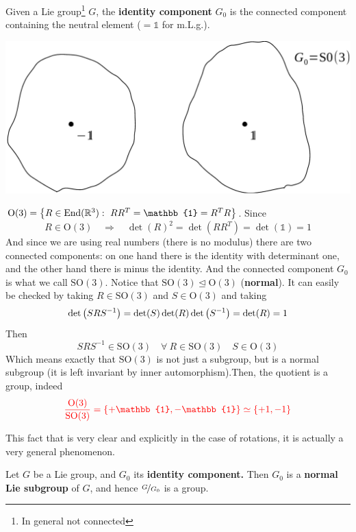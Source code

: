 \documentclass[../main.tex]{subfiles}
\begin{document}
\begin{definition} Given a Lie group\footnote{In general not connected} $G$, the \textbf{identity component} $G_0$ is the connected component containing the neutral element ($=\mathbb{1}$ for m.L.g.).
\end{definition}
\begin{marginfigure}[15mm]
	\includegraphics[width=1.2\linewidth]{images/Identity_component.pdf}
	\caption{}
\end{marginfigure}
\begin{example}
\( \textrm{O}(3)=\Bqty{R\in\textrm{End}(\mathbb{R}^3): \ RR^T=\mathbb{1}=R^TR}\). Since
\[
R\in\textrm{O}(3) \quad \Rightarrow \quad \det(R)^2=\det(RR^T)=\det(\mathbb{1})=1
\]
And since we are using real numbers (there is no modulus) there are two connected components: on one hand there is the identity with determinant one, and the other hand there is minus the identity. And the connected component $G_0$ is what we call $\textrm{SO}(3)$. Notice that $\textrm{SO}(3)\trianglelefteq \textrm{O}(3)$ (\textbf{normal}). It can easily be checked by taking $R\in \textrm{SO}(3)$ and $S \in \textrm{O}(3)$ and taking
\[
\det\pqty{SRS^{-1}}=\det(S)\det(R)\det\pqty{S^{-1}}=\det(R)=1
\]
Then
\[
SRS^{-1}\in \textrm{SO}(3) \quad \forall \ R \in \textrm{SO}(3) \quad S \in \textrm{O}(3)
\]
Which means exactly that $\textrm{SO}(3)$ is not just a subgroup, but is a normal subgroup (it is left invariant by inner automorphism).Then, the quotient is a group, indeed 
\[
{\color{red}\frac{\textrm{O}(3)}{\textrm{SO}(3)}=\Bqty{+\mathbb{1},-\mathbb{1}}\simeq\Bqty{+1,-1}}
\]
\end{example}
This fact that is very clear and explicitly in the case of rotations, it is actually a very general phenomenon.
\begin{theorem}Let $G$ be a Lie group, and $G_0$ its \textbf{identity component.} Then $G_0$ is a \textbf{normal Lie subgroup} of $G$, and hence $\nicefrac{G}{G_0}$ is a group.
\end{theorem}
\end{document}
